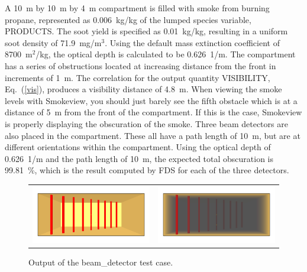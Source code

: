 \documentclass[11pt]{book}
\begin{document}
A 10~m by 10~m by 4~m compartment is filled with smoke from burning propane, represented as 0.006~kg/kg of
the lumped species variable, {\ct PRODUCTS}. The soot yield is specified as
0.01~kg/kg, resulting in a uniform soot density of 71.9~mg/m$^3$.
Using the default mass extinction coefficient of
8700~m$^2$/kg, the optical depth is calculated to be 0.626~\si{1/m}.  The
compartment has a series of obstructions located at increasing distance from the front in increments of
1~m.  The correlation for the output quantity
{\ct VISIBILITY}, Eq.~(\ref{vis}), produces a visibility distance of 4.8~m.
When viewing the smoke levels with Smokeview, you should just barely see
the fifth obstacle which is at a distance of 5~m from the front of the compartment.
If this is the case, Smokeview is properly displaying the obscuration of the
smoke.  Three beam detectors are also
placed in the compartment.  These all have a path length of 10~m,
but are at different orientations within the compartment.
Using the optical depth of 0.626~\si{1/m} and the path length of
10~m, the expected total obscuration is 99.81~\%, which is the
result computed by FDS for each of the three detectors.

\begin{figure}[ht]
\begin{tabular*}{\textwidth}{lr}
\includegraphics[width=3.2in]{SCRIPT_FIGURES/beam_detector_nosmoke} &
\includegraphics[width=3.2in]{SCRIPT_FIGURES/beam_detector_smoke}
\end{tabular*}
\caption[Results of the {\ct beam\_detector} test case]{Output of the {\ct beam\_detector} test case.}
\label{beam_detector}
\end{figure}
\end{document}
